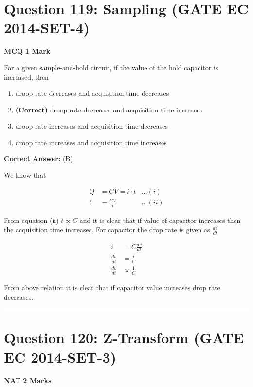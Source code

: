 \documentclass[11pt,a4paper]{article}
\begin{document}
\section*{Question 119: Sampling (GATE EC 2014-SET-4)}
\noindent \textbf{\color{primary}MCQ} \hfill \textbf{\color{secondary}1 Mark}


\noindent For a given sample-and-hold circuit, if the value of the hold capacitor is increased, then


\begin{enumerate}[label=(\Alph*)]
    \item droop rate decreases and acquisition time decreases
    \item \textbf{(Correct)} droop rate decreases and acquisition time increases
    \item droop rate increases and acquisition time decreases
    \item droop rate increases and acquisition time increases
\end{enumerate}

\noindent \textbf{Correct Answer:} (B)

\begin{tcolorbox}[solbox, title=Detailed Solution -- Question 119]
We know that

\[
\begin{aligned} Q&=C V=i \cdot t &\ldots(i)\\ t&=\frac{C V}{i} &\ldots(ii) \end{aligned}
\]

 From equation (ii) 
$t \propto C$ and it is clear that if value of capacitor increases then the acquisition time increases. For capacitor the drop rate is given as $\frac{d v}{d t}$

\[
\begin{aligned} i &=C \frac{d v}{d t} \\ \frac{d v}{d t} &=\frac{i}{C} \\ \frac{d v}{d t} & \propto \frac{1}{C} \end{aligned}
\]

 From above relation it is clear that if capacitor value  increases drop rate decreases.
\end{tcolorbox}

\vspace{1.5em}
\hrule
\vspace{1.5em}

\section*{Question 120: Z-Transform (GATE EC 2014-SET-3)}
\noindent \textbf{\color{primary}NAT} \hfill \textbf{\color{secondary}2 Marks}
\end{document}
